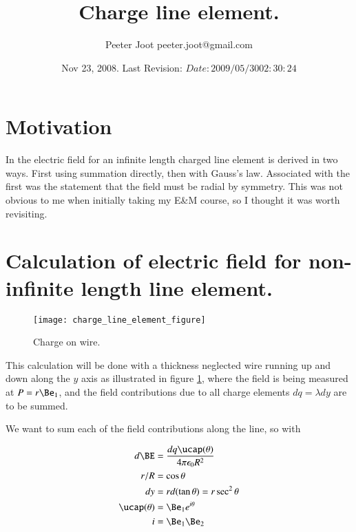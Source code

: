 \documentclass{article}
\title{ Charge line element. }
\author{Peeter Joot \quad peeter.joot@gmail.com}
\date{ Nov 23, 2008.  Last Revision: $Date: 2009/05/30 02:30:24 $ }
\begin{document}
\maketitle{}

\section{Motivation}

In \cite{purcell1963eam} the electric field for an infinite length charged line element is derived in two ways.  First using summation directly, then with Gauss's law.  Associated with the first was the statement that the field must be radial by symmetry.  This was not obvious to me when initially taking my E\&M course, so I thought it was worth revisiting.

\section{ Calculation of electric field for non-infinite length line element. }

\begin{figure}[htp]
\centering
\texttt{[image: charge\_line\_element\_figure]}
\caption{Charge on wire.}\label{fig:chargeLineElement}
\end{figure}

This calculation will be done with a thickness neglected wire running up and down along the $y$ axis as illustrated 
in figure \ref{fig:chargeLineElement}, where the field is being measured at $P = r \Be_1$, and the field contributions
due to all charge elements $dq = \lambda dy$ are to be summed.

We want to sum each of the field contributions along the line, so with

\begin{align*}
d\BE &= \frac{dq \ucap(\theta)}{4 \pi \epsilon_0 R^2} \\
r/R &= \cos\theta \\
dy &= r d(\tan\theta) = r \sec^2 \theta \\
\ucap(\theta) &= \Be_1 e^{i \theta} \\
i &= \Be_1 \Be_2 
\end{align*}

%
\end{document}
